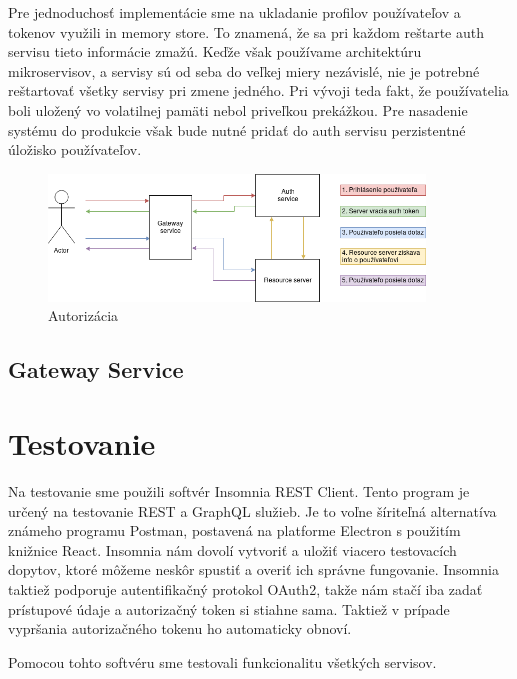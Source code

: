 Pre jednoduchosť implementácie sme na ukladanie profilov používateľov a tokenov využili in memory store. To znamená, že sa pri každom reštarte auth servisu tieto informácie zmažú. Keďže však používame architektúru mikroservisov, a servisy sú od seba do veľkej miery nezávislé, nie je potrebné reštartovať všetky servisy pri zmene jedného. Pri vývoji teda fakt, že používatelia boli uložený vo volatilnej pamäti nebol priveľkou prekážkou. Pre nasadenie systému do produkcie však bude nutné pridať do auth servisu perzistentné úložisko používateľov.  

\begin{figure}[!htbp] 
	\centering 
	\includegraphics[width=10cm]{img/auth_operation.png} 
	\caption{Autorizácia} 
	\label{auth_operation} 
\end{figure}  


\subsection{Gateway Service}  


\section{Testovanie}  
Na testovanie sme použili softvér Insomnia REST Client\cite{insomnia}. Tento program je určený na testovanie REST a GraphQL služieb. Je to voľne šíriteľná alternatíva známeho programu Postman, postavená na platforme Electron s použitím knižnice React. Insomnia nám dovolí vytvoriť a uložiť viacero testovacích dopytov, ktoré môžeme neskôr spustiť a overiť ich správne fungovanie. Insomnia taktiež podporuje autentifikačný protokol OAuth2, takže nám stačí iba zadať prístupové údaje a autorizačný token si stiahne sama. Taktiež v prípade vypršania autorizačného tokenu ho automaticky obnoví.  

Pomocou tohto softvéru sme testovali funkcionalitu všetkých servisov. 





